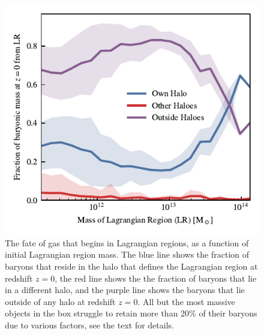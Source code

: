 \begin{figure}
	\centering
	\includegraphics{figures/s50j7kAHF/inverse_component_fraction.pdf}
	\vspace{-0.7cm}
	\caption{The fate of gas that begins in Lagrangian regions, as a function of
	initial Lagrangian region mass. The blue line shows the fraction of baryons
	that reside in the halo that defines the Lagrangian region at redshift $z=0$,
	the red line shows the the fraction of baryons that lie in a different halo,
	and the purple line shows the baryons that lie outside of any halo at redshift
	$z=0$. All but the most massive objects in the box struggle to retain more than
	20\% of their baryons due to various factors, see the text for details.}
	\label{fig:transferoutoflrs}
\end{figure}


